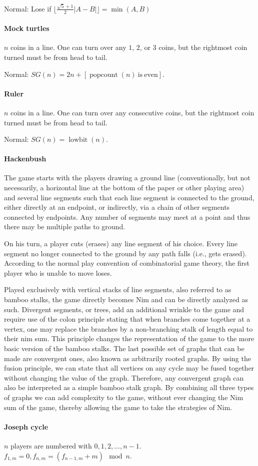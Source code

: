 Normal: Lose if $\lfloor \frac{\sqrt{5}+1}{2}|A-B| \rfloor=\min(A,B)$

\paragraph{Mock turtles}
$n$ coins in a line. One can turn over any $1$, $2$, or $3$ coins, but the rightmost coin turned must be from head to tail.

Normal: $SG(n)=2n+[\operatorname{popcount}(n)\mathrm{\ is\ even}]$.

\paragraph{Ruler}
$n$ coins in a line. One can turn over any consecutive coins, but the rightmost coin turned must be from head to tail.

Normal: $SG(n)=\operatorname{lowbit}(n)$.

\paragraph{Hackenbush}
The game starts with the players drawing a ground line (conventionally, but not necessarily, a horizontal line at the bottom of the paper or other playing area) and several line segments such that each line segment is connected to the ground, either directly at an endpoint, or indirectly, via a chain of other segments connected by endpoints. Any number of segments may meet at a point and thus there may be multiple paths to ground.

On his turn, a player cuts (erases) any line segment of his choice. Every line segment no longer connected to the ground by any path falls (i.e., gets erased). According to the normal play convention of combinatorial game theory, the first player who is unable to move loses.

Played exclusively with vertical stacks of line segments, also referred to as bamboo stalks, the game directly becomes Nim and can be directly analyzed as such. Divergent segments, or trees, add an additional wrinkle to the game and require use of the colon principle stating that when branches come together at a vertex, one may replace the branches by a non-branching stalk of length equal to their nim sum. This principle changes the representation of the game to the more basic version of the bamboo stalks. The last possible set of graphs that can be made are convergent ones, also known as arbitrarily rooted graphs. By using the fusion principle, we can state that all vertices on any cycle may be fused together without changing the value of the graph. Therefore, any convergent graph can also be interpreted as a simple bamboo stalk graph. By combining all three types of graphs we can add complexity to the game, without ever changing the Nim sum of the game, thereby allowing the game to take the strategies of Nim.

\paragraph{Joseph cycle}
$n$ players are numbered with $0,1,2,...,n-1$. $f_{1,m}=0,f_{n,m}=(f_{n-1,m}+m)\mod n$.
